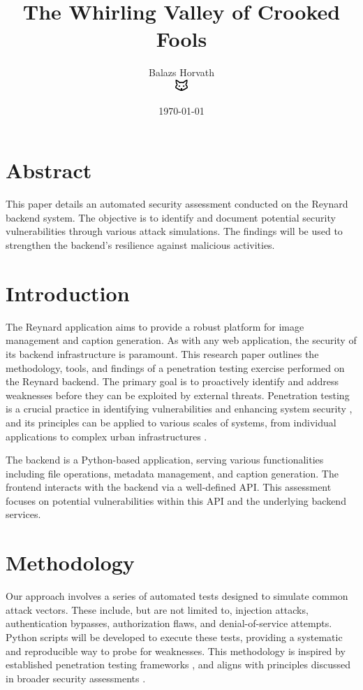 \documentclass{article}
\title{The Whirling Valley of Crooked Fools}
\author{Balazs Horvath \\ \includegraphics[width=0.5cm]{../shared-assets/favicon.pdf}}
\date{\today}
\begin{document}
\maketitle

\section*{Abstract}
This paper details an automated security assessment conducted on the Reynard backend system. The objective is to identify and document potential security vulnerabilities through various attack simulations. The findings will be used to strengthen the backend's resilience against malicious activities.

\section{Introduction}
The Reynard application aims to provide a robust platform for image management and caption generation. As with any web application, the security of its backend infrastructure is paramount. This research paper outlines the methodology, tools, and findings of a penetration testing exercise performed on the Reynard backend. The primary goal is to proactively identify and address weaknesses before they can be exploited by external threats. Penetration testing is a crucial practice in identifying vulnerabilities and enhancing system security \cite{Phong2014, Altulaihan2023}, and its principles can be applied to various scales of systems, from individual applications to complex urban infrastructures \cite{Conti2015}.

The backend is a Python-based application, serving various functionalities including file operations, metadata management, and caption generation. The frontend interacts with the backend via a well-defined API. This assessment focuses on potential vulnerabilities within this API and the underlying backend services.

\section{Methodology}
Our approach involves a series of automated tests designed to simulate common attack vectors. These include, but are not limited to, injection attacks, authentication bypasses, authorization flaws, and denial-of-service attempts. Python scripts will be developed to execute these tests, providing a systematic and reproducible way to probe for weaknesses. This methodology is inspired by established penetration testing frameworks \cite{Wai2001}, and aligns with principles discussed in broader security assessments \cite{Phong2014}.
\end{document}
